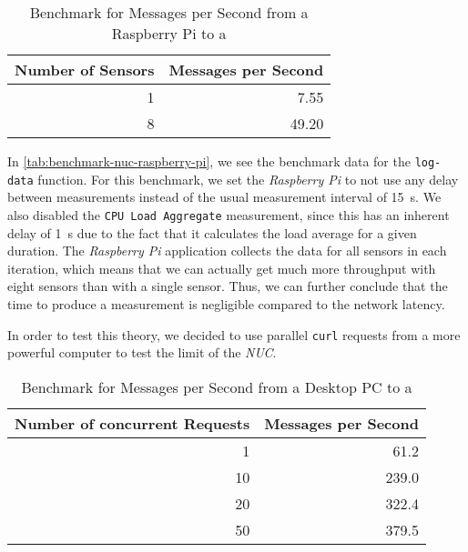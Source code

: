 \begin{table}[H]
  \centering
  \begin{tabular}{|r|r|}
    \hline
    Number of Sensors & Messages per Second \\ \hline
                    1 &                7.55 \\ \hline
                    8 &               49.20 \\ \hline
  \end{tabular}
  \caption{Benchmark for Messages per Second from a Raspberry Pi to a }
  \label{tab:benchmark-nuc-raspberry-pi}
\end{table}

In \autoref{tab:benchmark-nuc-raspberry-pi}, we see the benchmark data for the \texttt{log-data}
function. For this benchmark, we set the \textit{Raspberry Pi} to not use any delay between
measurements instead of the usual measurement interval of \SI{15}{\second}. We also disabled the
\texttt{CPU Load Aggregate} measurement, since this has an inherent delay of \SI{1}{\second} due to
the fact that it calculates the load average for a given duration. The \textit{Raspberry Pi}
application collects the data for all sensors in each iteration, which means that we can actually
get much more throughput with eight sensors than with a single sensor. Thus, we can further
conclude that the time to produce a measurement is negligible compared to the network latency.

In order to test this theory, we decided to use parallel \texttt{curl} requests from a more
powerful computer to test the limit of the \textit{NUC}.

\begin{table}[H]
  \centering
  \begin{tabular}{|r|r|}
    \hline
    Number of concurrent Requests & Messages per Second \\ \hline
                                1 &                61.2 \\ \hline
                               10 &               239.0 \\ \hline
                               20 &               322.4 \\ \hline
                               50 &               379.5 \\ \hline
  \end{tabular}
  \caption{Benchmark for Messages per Second from a Desktop PC to a }
  \label{tab:benchmark-nuc-curl}
\end{table}

